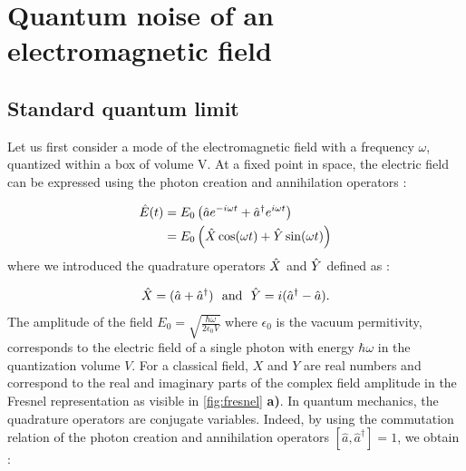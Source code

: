 \section{Quantum noise of an electromagnetic field}
\label{sec:intro_cv}
\subsection{Standard quantum limit}
Let us first consider a mode of the electromagnetic field with a frequency $\omega$, quantized within a box of volume V. At a fixed point in space, the electric field can be expressed using the photon creation and annihilation operators :

\begin{equation}
    \label{eq:field}
    \begin{aligned}
    \hat{E}(t) &= E_0\left( \hat{a} e^{-i\omega t} + \hat{a}^{\dagger} e^{i\omega t} \right) \\
    &= E_0\left(\hat{X}\cos (\omega t) + \hat{Y}\sin(\omega t)\right)
    \end{aligned}
\end{equation}
where we introduced the quadrature operators $\hat{X}$ and $\hat{Y}$ defined as :

\begin{equation}
    \label{eq:quad}
        \hat{X} = (\hat{a} + \hat{a}^{\dagger})  \ \ \mathrm{and}  \ \
        \hat{Y} = i(\hat{a}^{\dagger} - \hat{a}).
\end{equation}
The amplitude of the field $E_0=\sqrt{\frac{\hbar \omega}{2\epsilon_0 V}}$ where $\epsilon_0$ is the vacuum permitivity, corresponds to the electric field of a single photon with energy $\hbar \omega$ in the quantization volume $V$. 
For a classical field, $X$ and $Y$ are real numbers and correspond to the real and imaginary parts of the complex field amplitude in the Fresnel representation as visible in \autoref{fig:fresnel} \textbf{a)}. In quantum mechanics,
the quadrature operators are conjugate variables. Indeed, by using the commutation relation of the photon creation and annihilation operators $[\hat{a},\hat{a}^{\dagger}]=1$, we obtain :

